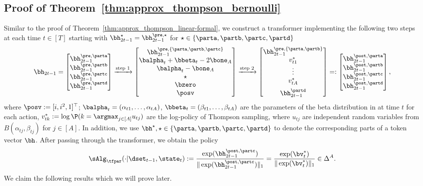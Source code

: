 \subsection{Proof of Theorem~\ref{thm:approx_thompson_bernoulli}}\label{sec:pf_thm:approx_thompson_bernoulli}
Similar to the proof of Theorem~\ref{thm:approx_thompson_linear-formal}, 
we construct a transformer implementing the following two steps at each time $t\in[T]$ starting with $\bh^{\star}_{2t-1}=\bh^{\pre,\star}_{2t-1}$ for $\star\in\{\parta,\partb,\partc,\partd\}$ 
\begin{align}
    \bh_{2t-1}=
    \begin{bmatrix}
    \bh_{2t-1}^{\pre,\parta} \\  \bh_{2t-1}^{\pre,\partb}\\  \bh_{2t-1}^{\pre,\partc}\\   \bh_{2t-1}^{\pre,\partd}
\end{bmatrix}
\xrightarrow{\text{step 1}}
   \begin{bmatrix}
    \bh_{2t-1}^{\pre,\{\parta,\partb,\partc\}} \\
        \balpha_t+\bbeta_t-2\bone_A\\\balpha_t-\bone_A\\ \star\\ \bzero \\\posv
\end{bmatrix}
\xrightarrow{\text{step 2}}
\begin{bmatrix}
    \bh_{2t-1}^{\pre,\{\parta,\partb\}}\\  v^*_{t1}\\\vdots\\ {v}^*_{tA} \vspace{0.5em}\\ \bh_{2t-1}^{\partd}
\end{bmatrix}
=:
\begin{bmatrix}
    \bh_{2t-1}^{\post,\parta} \\  \bh_{2t-1}^{\post,\partb}\\  \bh_{2t-1}^{\post,\partc}\\   \bh_{2t-1}^{\post,\partd}
\end{bmatrix},\label{eq:roadmap_ts_bernoulli}
\end{align}
where $\posv:=[i,i^2,1]^\top$; $\balpha_t=(\alpha_{t1},\ldots,\alpha_{tA})$, $\bbeta_t=(\beta_{t1},\ldots,\beta_{tA})$ are the parameters of the beta distribution in at time $t$ for each action, $v^*_{tk}:=\log \P(k=\argmax_{j\in[A]}u_{tj})$ are the log-policy of Thompson sampling, where $u_{tj}$ are independent random variables from $B(\alpha_{tj},\beta_{tj})$ for $j\in[A]$. In addition, we use $\bh^\star,\star\in\{\parta,\partb,\partc,\partd\}$ to denote the corresponding parts of a token vector $\bh$. After passing through the transformer, we obtain the policy
$$
\sAlg_\tfpar(\cdot|\dset_{t-1},\state_t):=\frac{\exp(\bh^{\post,\partc}_{2t-1})}{\|\exp(\bh^{\post,\partc}_{2t-1})\|_1}=\frac{\exp( \bv^*_t)}{\|\exp( \bv^*_t)\|_1}\in\Delta^A.
$$
We claim the following results which we will prove later.

